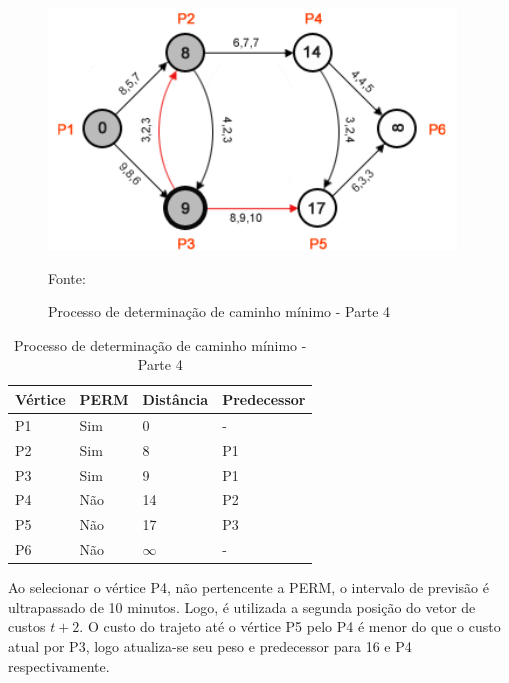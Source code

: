\begin{figure}[htbp]
\centering
 \includegraphics[width=.50\textwidth]{chapters/fig/leo5.png}
\caption{Processo de determinação de caminho mínimo - Parte 4}
Fonte: \cite{leonard}
\label{fig:leo5}
\end{figure}
\FloatBarrier
\begin{table}[htbp]
	\centering
	\begin{tabular}{l l l l}
	\toprule
	Vértice & PERM & Distância & Predecessor\\
	\midrule
	P1 & Sim & 0 & - \\
	P2 & Sim & 8 & P1 \\
	P3 & Sim & 9 & P1 \\
	P4 & Não & 14 & P2 \\
	P5 & Não & 17 & P3 \\
	P6 & Não & $\infty$ & - \\
	\bottomrule
	\end{tabular}
\caption{Processo de determinação de caminho mínimo - Parte 4}
 \label{tab:leotab4}
\end{table}

Ao selecionar o vértice P4, não pertencente a PERM, o intervalo de previsão é ultrapassado
de 10 minutos. Logo, é utilizada a segunda posição do vetor de custos $t + 2$. O custo do trajeto até
o vértice P5 pelo P4 é menor do que o custo atual por P3, logo atualiza-se seu peso e predecessor
para 16 e P4 respectivamente.

